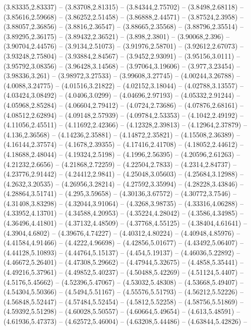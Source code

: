 {(3.83335,2.83337) -- (3.83708,2.81315) -- (3.84344,2.75702) -- (3.8498,2.68118) -- (3.85616,2.59668) -- (3.86252,2.51458) -- (3.86888,2.44571) -- (3.87524,2.3958) -- (3.88057,2.36856) -- (3.8816,2.36547) -- (3.88665,2.35568) -- (3.88796,2.35514) --
(3.89295,2.36175) -- (3.89432,2.36521) -- (3.898,2.3801) -- (3.90068,2.396) -- (3.90704,2.44576) -- (3.9134,2.51073) -- (3.91976,2.58701) -- (3.92612,2.67073) -- (3.93248,2.75804) -- (3.93884,2.84567) -- (3.9452,2.93091) -- (3.95156,3.0111) --
(3.95792,3.08356) -- (3.96428,3.14568) -- (3.97064,3.19606) -- (3.977,3.23454) -- (3.98336,3.261) -- (3.98972,3.27533) -- (3.99608,3.27745) -- (4.00244,3.26788) -- (4.0088,3.24775) -- (4.01516,3.21822) -- (4.02152,3.18044) -- (4.02788,3.13557) --
(4.03424,3.08492) -- (4.0406,3.0299) -- (4.04696,2.97193) -- (4.05332,2.91244) -- (4.05968,2.85284) -- (4.06604,2.79412) -- (4.0724,2.73686) -- (4.07876,2.68161) -- (4.08512,2.62894) -- (4.09148,2.57939) -- (4.09784,2.53353) -- (4.1042,2.49192) --
(4.11056,2.45511) -- (4.11692,2.42366) -- (4.12328,2.39813) -- (4.12964,2.37879) -- (4.136,2.36568) -- (4.14236,2.35881) -- (4.14872,2.35821) -- (4.15508,2.36389) -- (4.16144,2.37574) -- (4.1678,2.39355) -- (4.17416,2.41708) -- (4.18052,2.44612) --
(4.18688,2.48044) -- (4.19324,2.5198) -- (4.1996,2.56395) -- (4.20596,2.61263) -- (4.21232,2.6656) -- (4.21868,2.72259) -- (4.22504,2.7833) -- (4.2314,2.84737) -- (4.23776,2.91442) -- (4.24412,2.9841) -- (4.25048,3.05603) -- (4.25684,3.12988) --
(4.2632,3.20535) -- (4.26956,3.28214) -- (4.27592,3.35994) -- (4.28228,3.43846) -- (4.28864,3.51741) -- (4.295,3.59658) -- (4.30136,3.67572) -- (4.30772,3.7546) -- (4.31408,3.83298) -- (4.32044,3.91064) -- (4.3268,3.98735) -- (4.33316,4.06288) --
(4.33952,4.13701) -- (4.34588,4.20953) -- (4.35224,4.28042) -- (4.3586,4.34985) -- (4.36496,4.41801) -- (4.37132,4.48509) -- (4.37768,4.55125) -- (4.38404,4.61641) -- (4.3904,4.6802) -- (4.39676,4.74227) -- (4.40312,4.80224) -- (4.40948,4.85976) --
(4.41584,4.91466) -- (4.4222,4.96698) -- (4.42856,5.01677) -- (4.43492,5.06407) -- (4.44128,5.10893) -- (4.44764,5.15137) -- (4.454,5.19137) -- (4.46036,5.22892) -- (4.46672,5.26401) -- (4.47308,5.29662) -- (4.47944,5.32675) -- (4.4858,5.35441) --
(4.49216,5.37961) -- (4.49852,5.40237) -- (4.50488,5.42269) -- (4.51124,5.4407) -- (4.5176,5.45662) -- (4.52396,5.47067) -- (4.53032,5.48308) -- (4.53668,5.49407) -- (4.54304,5.50366) -- (4.5494,5.51167) -- (4.55576,5.51793) -- (4.56212,5.52226) --
(4.56848,5.52447) -- (4.57484,5.52454) -- (4.5812,5.52258) -- (4.58756,5.51869) -- (4.59392,5.51298) -- (4.60028,5.50557) -- (4.60664,5.49654) -- (4.613,5.48591) -- (4.61936,5.47373) -- (4.62572,5.46004) -- (4.63208,5.44486) -- (4.63844,5.42826) --
}
